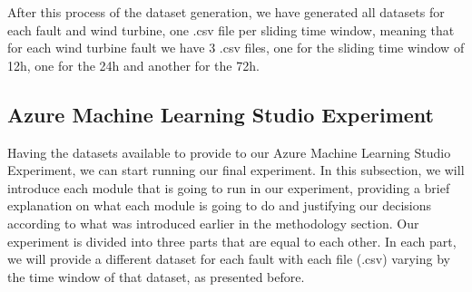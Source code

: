After this process of the dataset generation, we have generated all datasets for each fault and wind turbine, one .csv file per sliding time window, meaning that for each wind turbine fault we have 3 .csv files, one for the sliding time window of 12h, one for the 24h and another for the 72h.


\subsection{Azure Machine Learning Studio Experiment}
Having the datasets available to provide to our Azure Machine Learning Studio Experiment, we can start running our final experiment.
In this subsection, we will introduce each module that is going to run in our experiment, providing a brief explanation on what each module is going to do and justifying our decisions according to what was introduced earlier in the methodology section.
Our experiment is divided into three parts that are equal to each other. In each part, we will provide a different dataset for each fault with each file (.csv) varying by the time window of that dataset, as presented before.

